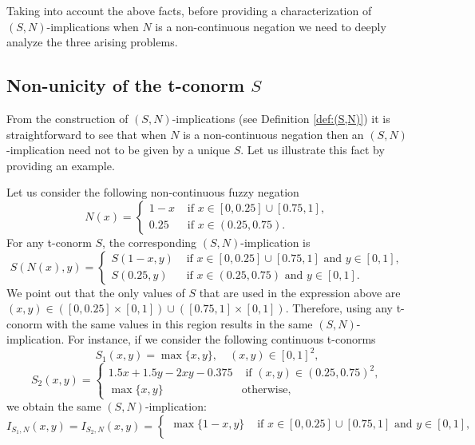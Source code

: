 Taking into account the above facts, before providing a characterization of $(S,N)$-implications when $N$ is a non-continuous negation we need to deeply analyze the three arising problems.

\subsection{Non-unicity of the t-conorm $S$}\label{subsection:equivalence-relation}

From the construction of $(S,N)$-implications (see Definition \ref{def:(S,N)}) it is straightforward to see that when $N$ is a non-continuous negation then an $(S,N)$-implication need not to be given by a unique $S$. Let us illustrate this fact by providing an example.

\begin{example}\label{Ex:NoUnicityS}
	Let us consider the following non-continuous fuzzy negation
	$$N(x) = \left\{\begin{array}{ll}
		1-x & \text{ if } x \in [0,0.25]\cup[0.75,1], \\
		0.25 & \text{ if } x \in (0.25,0.75). 
	\end{array}
	\right. 
	$$
	For any t-conorm $S$, the corresponding $(S,N)$-implication is
	$$
	S(N(x),y)
	=
	\left\{\begin{array}{ll}
		S(1-x,y) & \text{ if } x \in [0,0.25]\cup[0.75,1] \text{ and } y \in [0,1], \\
		S(0.25,y) & \text{ if } x \in (0.25,0.75) \text{ and } y \in [0,1]. 
	\end{array}
	\right.
	$$
	We point out that the only values of $S$ that are used in the expression above are $(x,y) \in ([0,0.25]\times [0,1]) \cup ([0.75,1] \times [0,1])$. Therefore, using any t-conorm with the same values in this region results in the same $(S,N)$-implication. For instance, if we consider the following continuous t-conorms
	$$S_1(x,y)=\max\{x,y\}, \quad (x,y)\in[0,1]^2,$$
	$$S_2(x,y)= \left\{\begin{array}{ll}
		1.5x+1.5y-2xy-0.375 & \text{ if } (x,y) \in (0.25,0.75)^2, \\
		\max\{x,y\} & \text{otherwise}, 
	\end{array}
	\right.
	$$
	we obtain the same $(S,N)$-implication:
	\begin{equation}\label{eq:example1}
		I_{S_1,N}(x,y)=I_{S_2,N}(x,y)= \left\{\begin{array}{ll}
			\max\{1-x,y\} & \text{ if } x \in [0,0.25] \cup [0.75,1] \text{ and } y \in [0,1], \\

\end{array}
\end{equation}
\end{example}

